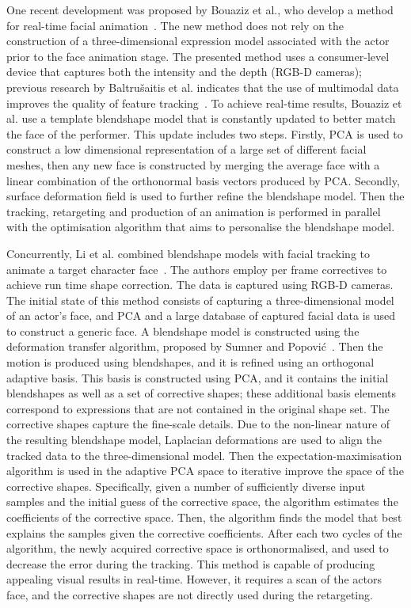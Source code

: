 One recent development was proposed by Bouaziz et al., who develop a method for real-time facial animation~\cite{Bouaziz:2013}. The new method does not rely on the construction of a three-dimensional expression model  associated with the actor prior to the face animation stage. The presented method uses a consumer-level device that captures both the intensity and the depth (RGB-D cameras); previous research by Baltru\v{s}aitis et al. indicates that the use of multimodal data improves the quality of feature tracking~\cite{Baltrusaitis:2012}. To achieve real-time results, Bouaziz et al. use a template blendshape model that is constantly updated to better match the face of the performer. This update includes two steps. Firstly, PCA is used to construct a low dimensional representation of a large set of different facial meshes, then any new face is constructed by merging the average face with a linear combination of the orthonormal basis vectors produced by PCA. Secondly, surface deformation field is used to further refine the blendshape model. Then the tracking, retargeting and production of an animation is performed in parallel with the optimisation algorithm that aims to personalise the blendshape model. 

Concurrently, Li et al. combined blendshape models with facial tracking to animate a target character face~\cite{Li:2013}. The authors employ per frame correctives to achieve run time shape correction. The data is captured using RGB-D cameras. The initial state of this method consists of capturing a three-dimensional model of an actor's face, and PCA  and a large database of captured facial data is used to construct a generic face. A blendshape model is constructed using the deformation transfer algorithm, proposed by Sumner and Popovi\'{c}~\cite{Sumner:2004}. Then the motion is produced using blendshapes, and it is refined using an orthogonal adaptive basis. This basis is constructed using PCA, and it contains the initial blendshapes as well as a set of corrective shapes; these additional basis elements correspond to expressions that are not contained in the original shape set. The corrective shapes capture the fine-scale details. Due to the non-linear nature of the resulting blendshape model, Laplacian deformations are used to align the tracked data to the three-dimensional model. Then the expectation-maximisation algorithm is used in the adaptive PCA space to iterative improve the space of the corrective shapes. Specifically, given a number of sufficiently diverse input samples and the initial guess of the corrective space, the algorithm estimates the coefficients of the corrective space. Then, the algorithm finds the model that best explains the samples given the corrective coefficients. After each two cycles of the algorithm, the newly acquired corrective space is orthonormalised, and used to decrease the error during the tracking. This method is capable of producing appealing visual results in real-time. However, it requires a scan of the actors face, and the corrective shapes are not directly used during the retargeting.

